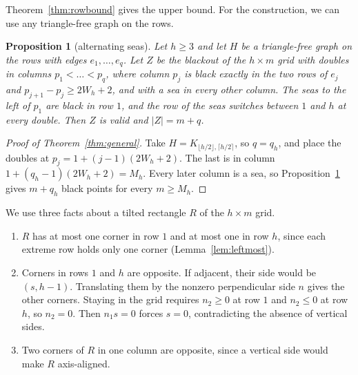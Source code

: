 \documentclass[12pt]{article}
\theoremstyle{plain}
\newtheorem{proposition}[theorem]{Proposition}
\theoremstyle{definition}
\theoremstyle{remark}
\begin{document}
Theorem~\ref{thm:rowbound} gives the upper bound. For the construction,
we can use any triangle-free graph on the rows.

\begin{proposition}[alternating seas]\label{prop:seas}
Let $h\ge3$ and let $H$ be a triangle-free graph on the rows with edges $e_1,\dots,e_q$.
Let $Z$ be the blackout of the $h\times m$ grid with doubles in columns $p_1<\dots<p_q$, where
column $p_j$ is black exactly in the two rows of $e_j$ and $p_{j+1}-p_j\ge2W_h+2$, and with a sea
in every other column. The seas to the left of $p_1$ are black in row $1$, and the row of the
seas switches between $1$ and $h$ at every double. Then $Z$ is valid and $|Z|=m+q$.
\end{proposition}

\begin{proof}[Proof of Theorem~\ref{thm:general}]
Take $H=K_{\lfloor h/2\rfloor,\lceil h/2\rceil}$, so $q=q_h$, and place the doubles
at $p_j=1+(j-1)(2W_h+2)$. The last is in column $1+(q_h-1)(2W_h+2)=M_h$.
Every later column is a sea, so Proposition~\ref{prop:seas} gives $m+q_h$
black points for every $m\ge M_h$.
\end{proof}

We use three facts about a tilted rectangle $R$ of the $h\times m$ grid.
\begin{enumerate}[(F1)]
\item $R$ has at most one corner in row $1$ and at most one in row $h$,
since each extreme row holds only one corner (Lemma~\ref{lem:leftmost}).
\item Corners in rows $1$ and $h$ are opposite. If adjacent, their side would be
$(s,h-1)$. Translating them by the nonzero perpendicular side $n$ gives the
other corners. Staying in the grid requires $n_2\ge0$ at row $1$ and
$n_2\le0$ at row $h$, so $n_2=0$. Then $n_1s=0$ forces $s=0$,
contradicting the absence of vertical sides.
\item Two corners of $R$ in one column are opposite, since a vertical side would make $R$
axis-aligned.
\end{enumerate}
\end{document}
